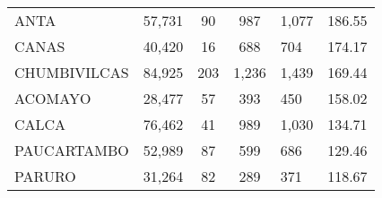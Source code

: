 \begin{tabular}{lrcclr}
	\cellcolor[HTML]{FFFF99}ANTA                                   & 57,731                                                         & 90                                                         & 987                  & 1,077                                                               & 186.55                                                                       \\
	\cellcolor[HTML]{FFFF99}CANAS                                  & 40,420                                                         & 16                                                         & 688                  & 704                                                                 & 174.17                                                                       \\
	\cellcolor[HTML]{C6E0B4}CHUMBIVILCAS                           & 84,925                                                         & 203                                                        & 1,236                & 1,439                                                               & 169.44                                                                       \\
	\cellcolor[HTML]{C6E0B4}ACOMAYO                                & 28,477                                                         & 57                                                         & 393                  & 450                                                                 & 158.02                                                                       \\
	\cellcolor[HTML]{C6E0B4}CALCA                                  & 76,462                                                         & 41                                                         & 989                  & 1,030                                                               & 134.71                                                                       \\
	\cellcolor[HTML]{C6E0B4}PAUCARTAMBO                            & 52,989                                                         & 87                                                         & 599                  & 686                                                                 & 129.46                                                                       \\
	\cellcolor[HTML]{C6E0B4}PARURO                                 & 31,264                                                         & 82                                                         & 289                  & 371                                                                 & 118.67                                                                       \\

\end{tabular}
